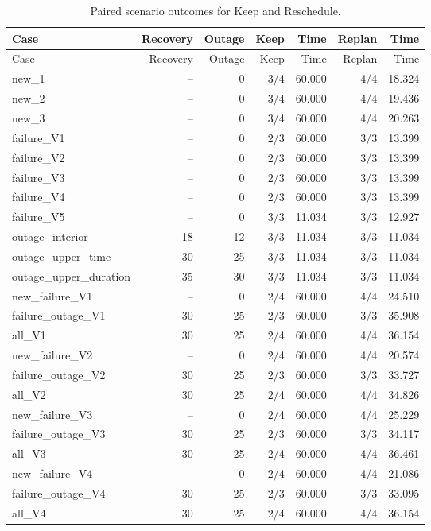 \begin{longtable}{@{}p{.37\linewidth}rrrrrr@{}}
\caption{Paired scenario outcomes for Keep and Reschedule.}\\
\toprule
Case & Recovery & Outage & Keep & Time & Replan & Time\\
\midrule
\endfirsthead
\toprule
Case & Recovery & Outage & Keep & Time & Replan & Time\\
\midrule
\endhead
\bottomrule
\endlastfoot
new\_1 & -- & 0 & 3/4 & 60.000 & 4/4 & 18.324\\
new\_2 & -- & 0 & 3/4 & 60.000 & 4/4 & 19.436\\
new\_3 & -- & 0 & 3/4 & 60.000 & 4/4 & 20.263\\
failure\_V1 & -- & 0 & 2/3 & 60.000 & 3/3 & 13.399\\
failure\_V2 & -- & 0 & 2/3 & 60.000 & 3/3 & 13.399\\
failure\_V3 & -- & 0 & 2/3 & 60.000 & 3/3 & 13.399\\
failure\_V4 & -- & 0 & 2/3 & 60.000 & 3/3 & 13.399\\
failure\_V5 & -- & 0 & 3/3 & 11.034 & 3/3 & 12.927\\
outage\_interior & 18 & 12 & 3/3 & 11.034 & 3/3 & 11.034\\
outage\_upper\_time & 30 & 25 & 3/3 & 11.034 & 3/3 & 11.034\\
outage\_upper\_duration & 35 & 30 & 3/3 & 11.034 & 3/3 & 11.034\\
new\_failure\_V1 & -- & 0 & 2/4 & 60.000 & 4/4 & 24.510\\
failure\_outage\_V1 & 30 & 25 & 2/3 & 60.000 & 3/3 & 35.908\\
all\_V1 & 30 & 25 & 2/4 & 60.000 & 4/4 & 36.154\\
new\_failure\_V2 & -- & 0 & 2/4 & 60.000 & 4/4 & 20.574\\
failure\_outage\_V2 & 30 & 25 & 2/3 & 60.000 & 3/3 & 33.727\\
all\_V2 & 30 & 25 & 2/4 & 60.000 & 4/4 & 34.826\\
new\_failure\_V3 & -- & 0 & 2/4 & 60.000 & 4/4 & 25.229\\
failure\_outage\_V3 & 30 & 25 & 2/3 & 60.000 & 3/3 & 34.117\\
all\_V3 & 30 & 25 & 2/4 & 60.000 & 4/4 & 36.461\\
new\_failure\_V4 & -- & 0 & 2/4 & 60.000 & 4/4 & 21.086\\
failure\_outage\_V4 & 30 & 25 & 2/3 & 60.000 & 3/3 & 33.095\\
all\_V4 & 30 & 25 & 2/4 & 60.000 & 4/4 & 36.154\\

\end{longtable}
